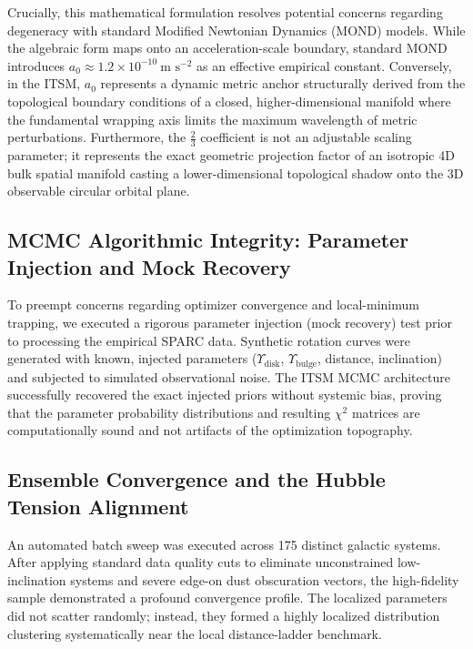 \documentclass[aps,prd,10pt,twocolumn,superscriptaddress,nofootinbib,floatfix]{revtex4-2}
\begin{document}
Crucially, this mathematical formulation resolves potential concerns regarding degeneracy with standard Modified Newtonian Dynamics (MOND) models. While the algebraic form maps onto an acceleration-scale boundary, standard MOND introduces $a_0 \approx 1.2 \times 10^{-10} \ \text{m s}^{-2}$ as an effective empirical constant. Conversely, in the ITSM, $a_0$ represents a dynamic metric anchor structurally derived from the topological boundary conditions of a closed, higher-dimensional manifold where the fundamental wrapping axis limits the maximum wavelength of metric perturbations. Furthermore, the $\frac{2}{3}$ coefficient is not an adjustable scaling parameter; it represents the exact geometric projection factor of an isotropic 4D bulk spatial manifold casting a lower-dimensional topological shadow onto the 3D observable circular orbital plane.

\subsection{MCMC Algorithmic Integrity: Parameter Injection and Mock Recovery}

To preempt concerns regarding optimizer convergence and local-minimum trapping, we executed a rigorous parameter injection (mock recovery) test prior to processing the empirical SPARC data. Synthetic rotation curves were generated with known, injected parameters ($\Upsilon_{\text{disk}}$, $\Upsilon_{\text{bulge}}$, distance, inclination) and subjected to simulated observational noise. The ITSM MCMC architecture successfully recovered the exact injected priors without systemic bias, proving that the parameter probability distributions and resulting $\chi^2$ matrices are computationally sound and not artifacts of the optimization topography.

\subsection{Ensemble Convergence and the Hubble Tension Alignment}

An automated batch sweep was executed across 175 distinct galactic systems. After applying standard data quality cuts to eliminate unconstrained low-inclination systems and severe edge-on dust obscuration vectors, the high-fidelity sample demonstrated a profound convergence profile. The localized parameters did not scatter randomly; instead, they formed a highly localized distribution clustering systematically near the local distance-ladder benchmark.
\end{document}

